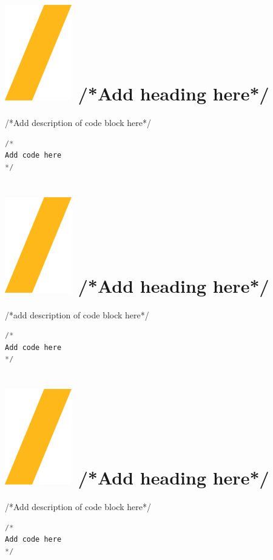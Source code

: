 \documentclass[9pt,landscape]{article}
\begin{document}
\begin{multicols}{3}
\setlength{\premulticols}{1pt}
\setlength{\postmulticols}{1pt}
\setlength{\multicolsep}{1pt}
\setlength{\columnsep}{2pt}

\section{\includegraphics[height=\fontcharht\font`\S]{slash.png} /*Add heading here*/}
/*Add description of code block here*/
\begin{lstlisting}[language=Python]
/*
Add code here
*/
\end{lstlisting}

\vfill
\section{\includegraphics[height=\fontcharht\font`\S]{slash.png}  /*Add heading here*/}
/*add description of code block here*/
\begin{lstlisting}[language=Python]
/*
Add code here
*/
\end{lstlisting} 
\vfill

\section{\includegraphics[height=\fontcharht\font`\S]{slash.png}  /*Add heading here*/}
/*Add description of code block here*/
\begin{lstlisting}[language=Python]
/*
Add code here
*/
\end{lstlisting} 


\end{multicols}
\end{document}
